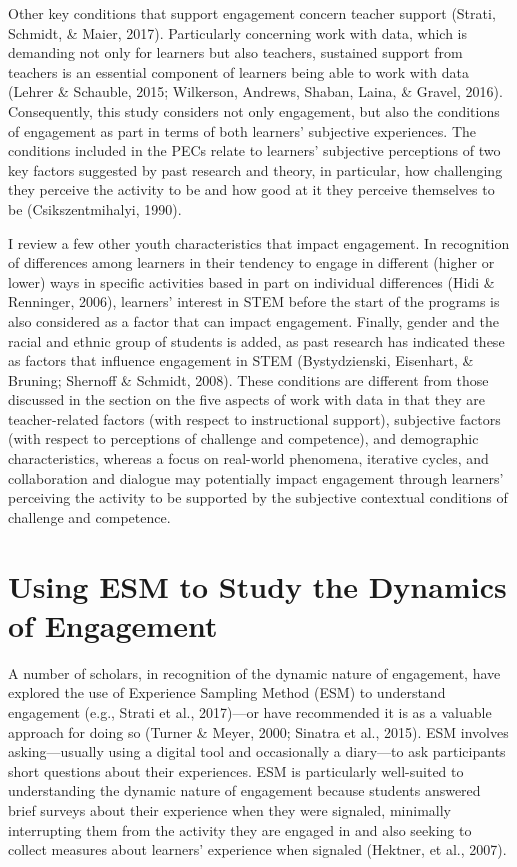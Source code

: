 \documentclass[]{msu-thesis}
\theoremstyle{definition}
\theoremstyle{definition}
\theoremstyle{definition}
\theoremstyle{remark}
\begin{document}
Other key conditions that support engagement concern teacher support
(Strati, Schmidt, \& Maier, 2017). Particularly concerning work with
data, which is demanding not only for learners but also teachers,
sustained support from teachers is an essential component of learners
being able to work with data (Lehrer \& Schauble, 2015; Wilkerson,
Andrews, Shaban, Laina, \& Gravel, 2016). Consequently, this study
considers not only engagement, but also the conditions of engagement as
part in terms of both learners' subjective experiences. The conditions
included in the PECs relate to learners' subjective perceptions of two
key factors suggested by past research and theory, in particular, how
challenging they perceive the activity to be and how good at it they
perceive themselves to be (Csikszentmihalyi, 1990).

I review a few other youth characteristics that impact engagement. In
recognition of differences among learners in their tendency to engage in
different (higher or lower) ways in specific activities based in part on
individual differences (Hidi \& Renninger, 2006), learners' interest in
STEM before the start of the programs is also considered as a factor
that can impact engagement. Finally, gender and the racial and ethnic
group of students is added, as past research has indicated these as
factors that influence engagement in STEM (Bystydzienski, Eisenhart, \&
Bruning; Shernoff \& Schmidt, 2008). These conditions are different from
those discussed in the section on the five aspects of work with data in
that they are teacher-related factors (with respect to instructional
support), subjective factors (with respect to perceptions of challenge
and competence), and demographic characteristics, whereas a focus on
real-world phenomena, iterative cycles, and collaboration and dialogue
may potentially impact engagement through learners' perceiving the
activity to be supported by the subjective contextual conditions of
challenge and competence.

\section{Using ESM to Study the Dynamics of
Engagement}\label{using-esm-to-study-the-dynamics-of-engagement}

A number of scholars, in recognition of the dynamic nature of
engagement, have explored the use of Experience Sampling Method (ESM) to
understand engagement (e.g., Strati et al., 2017)---or have recommended
it is as a valuable approach for doing so (Turner \& Meyer, 2000;
Sinatra et al., 2015). ESM involves asking---usually using a digital
tool and occasionally a diary---to ask participants short questions
about their experiences. ESM is particularly well-suited to
understanding the dynamic nature of engagement because students answered
brief surveys about their experience when they were signaled, minimally
interrupting them from the activity they are engaged in and also seeking
to collect measures about learners' experience when signaled (Hektner,
et al., 2007).
\end{document}

